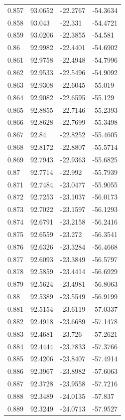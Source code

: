 \begin{tabular}{llll}
0.857 & 93.0652 & -22.2767 & -54.3634 \\
0.858 & 93.043 & -22.331 & -54.4721 \\
0.859 & 93.0206 & -22.3855 & -54.581 \\
0.86 & 92.9982 & -22.4401 & -54.6902 \\
0.861 & 92.9758 & -22.4948 & -54.7996 \\
0.862 & 92.9533 & -22.5496 & -54.9092 \\
0.863 & 92.9308 & -22.6045 & -55.019 \\
0.864 & 92.9082 & -22.6595 & -55.129 \\
0.865 & 92.8855 & -22.7146 & -55.2393 \\
0.866 & 92.8628 & -22.7699 & -55.3498 \\
0.867 & 92.84 & -22.8252 & -55.4605 \\
0.868 & 92.8172 & -22.8807 & -55.5714 \\
0.869 & 92.7943 & -22.9363 & -55.6825 \\
0.87 & 92.7714 & -22.992 & -55.7939 \\
0.871 & 92.7484 & -23.0477 & -55.9055 \\
0.872 & 92.7253 & -23.1037 & -56.0173 \\
0.873 & 92.7022 & -23.1597 & -56.1293 \\
0.874 & 92.6791 & -23.2158 & -56.2416 \\
0.875 & 92.6559 & -23.272 & -56.3541 \\
0.876 & 92.6326 & -23.3284 & -56.4668 \\
0.877 & 92.6093 & -23.3849 & -56.5797 \\
0.878 & 92.5859 & -23.4414 & -56.6929 \\
0.879 & 92.5624 & -23.4981 & -56.8063 \\
0.88 & 92.5389 & -23.5549 & -56.9199 \\
0.881 & 92.5154 & -23.6119 & -57.0337 \\
0.882 & 92.4918 & -23.6689 & -57.1478 \\
0.883 & 92.4681 & -23.726 & -57.2621 \\
0.884 & 92.4444 & -23.7833 & -57.3766 \\
0.885 & 92.4206 & -23.8407 & -57.4914 \\
0.886 & 92.3967 & -23.8982 & -57.6063 \\
0.887 & 92.3728 & -23.9558 & -57.7216 \\
0.888 & 92.3489 & -24.0135 & -57.837 \\
0.889 & 92.3249 & -24.0713 & -57.9527 \\

\end{tabular}
